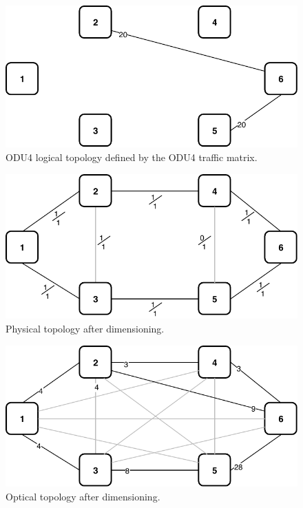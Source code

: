 \begin{figure}[h!]
\centering
\includegraphics[width=12cm]{sdf/ilp/translucent_survivability/figures/logical_topology_ODU4_high}
\caption{ODU4 logical topology defined by the ODU4 traffic matrix.}
\label{logical3_ODU4_high}
\end{figure}

\begin{figure}[h!]
\centering
\includegraphics[width=12cm]{sdf/ilp/translucent_survivability/figures/physical_topology_high}
\caption{Physical topology after dimensioning.}
\label{physical3_high}
\end{figure}

\newpage
\begin{figure}[h!]
\centering
\includegraphics[width=13cm]{sdf/ilp/translucent_survivability/figures/optical_topology_high}
\caption{Optical topology after dimensioning.}
\label{optical3_high}
\end{figure}

